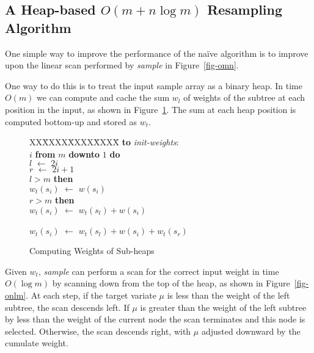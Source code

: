 \documentclass[12pt]{article}
\newcommand{\asgn}{\,\,\leftarrow\,\,}
\begin{document}
\subsection{A Heap-based $O(m + n \log m)$ Resampling Algorithm}\label{sec-heap}

  One simple way to improve the performance of the na\"ive
  algorithm is to improve upon the linear scan performed by
  {\em sample} in Figure~\ref{fig-omn}.

  One way to do this is to treat the input sample array as a
  binary heap.  In time $O(m)$ we can compute and cache the
  sum $w_l$ of weights of the subtree at each position in
  the input, as shown in Figure~\ref{fig-heap}.  The sum at
  each heap position is computed bottom-up and stored as
  $w_t$.

  \begin{figure}
    \centering
    \begin{minipage}{0.6\textwidth}
      \begin{tabbing}
      XX\=XXXX\=XXXX\=XXXX\=\kill
      {\bf to} {\it init-weights}: \\
       $i$ {\bf from} $m$ {\bf downto} $1$ {\bf do} \\
      \>\>$l \asgn 2i$ \\
      \>\>$r \asgn 2i + 1$ \\
      \> $l > m$ {\bf then} \\
      \>\>\>$w_t(s_i) \asgn w(s_i)$ \\
      \> $r > m$ {\bf then} \\
      \>\>\>$w_t(s_i) \asgn w_t(s_l) + w(s_i)$ \\
      \>\\
      \>\>\>$w_t(s_i) \asgn w_t(s_l) + w(s_i) + w_t(s_r)$
    \end{tabbing}
    \end{minipage}
    \caption{Computing Weights of Sub-heaps}\label{fig-heap}
  \end{figure}

  Given $w_t$, {\em sample} can perform a scan for the
  correct input weight in time $O(\log m)$ by scanning down
  from the top of the heap, as shown in
  Figure~\ref{fig-onlm}.  At each step, if the target
  variate $\mu$ is less than the weight of the left subtree,
  the scan descends left.  If $\mu$ is greater than the
  weight of the left subtree by less than the weight of the
  current node the scan terminates and this node is
  selected.  Otherwise, the scan descends right, with
  $\mu$ adjusted downward by the cumulate weight.
\end{document}
